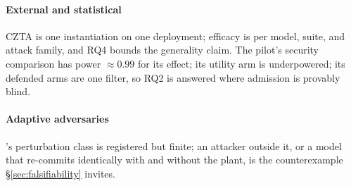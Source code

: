 \paragraph*{External and statistical}
CZTA is one instantiation on one deployment; efficacy is per model,
suite, and attack family, and RQ4 bounds the generality claim. The
pilot's security comparison has power $\approx 0.99$ for its effect;
its utility arm is underpowered; its defended arms are one filter, so
RQ2 is answered where admission is provably blind.
\paragraph*{Adaptive adversaries}
\Ifive's perturbation class is registered but finite; an attacker
outside it, or a model that re-commits identically with and without
the plant, is the counterexample \S\ref{sec:falsifiability} invites.
